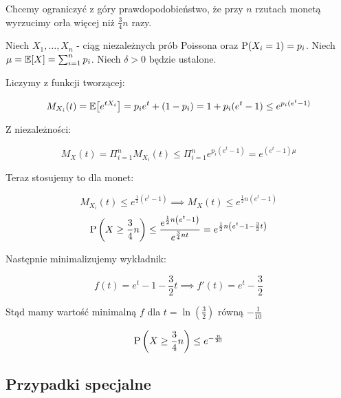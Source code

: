 \begin{example}
    Chcemy ograniczyć z góry prawdopodobieństwo, że przy \(n\) rzutach monetą wyrzucimy orła więcej niż \( \frac{3}{4} n \) razy.

    Niech \( X_1, \ldots, X_n \) - ciąg niezależnych prób Poissona oraz \( \operatorname{P}(X_i = 1) = p_i \). Niech \( \mu = \expected{X} = \sum_{i=1}^{n} p_i \). Niech \( \delta > 0 \) będzie ustalone.

    Liczymy z funkcji tworzącej:

    \[
        M_{X_i}(t) = \expected{e^{tX_i}} = p_ie^t + (1 - p_i) = 1 + p_i(e^t - 1) \leq e^{p_i(e^t-1)}
    \]

    Z niezależności:

    \[
        M_X(t) = \Pi_{i=1}^n M_{X_i}(t) \leq \Pi_{i=1}^n e^{p_i(e^t - 1)} = e^{(e^t - 1)\mu}
    \]

    Teraz stosujemy to dla monet:

    \[
        M_{X_i}(t) \leq e^{\frac{1}{2} \left( e^t - 1 \right)} \implies M_X(t) \leq e^{\frac{1}{2} n \left( e^t - 1 \right)}
    \]
    \[
        \operatorname{P}\left( X \geq \frac{3}{4}n \right) \leq 
        \frac{e^{\frac{1}{2} n \left( e^t - 1 \right)}}{e^{\frac{3}{4} nt}} = e^{\frac{1}{2} n \left( e^t - 1 - \frac{3}{2} t \right)}
    \]

    Następnie minimalizujemy wykładnik:

    \[
        f(t) = e^t - 1 - \frac{3}{2}t \implies f'(t) = e^t - \frac{3}{2}
    \]

    Stąd mamy wartość minimalną \( f \) dla \( t = \ln\left(\frac{3}{2}\right) \) równą \( -\frac{1}{10} \)

    \[
        \operatorname{P}\left( X \geq \frac{3}{4}n \right) \leq e^{-\frac{n}{20}}
    \]
\end{example}

\subsection{Przypadki specjalne}

